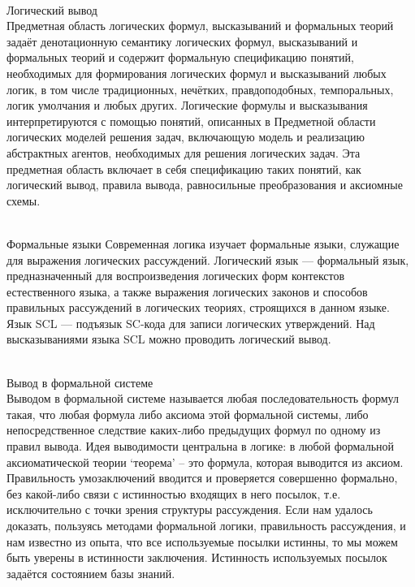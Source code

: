 \begin{frame}{\\Логический вывод}
\topline
\vspace{40pt}
 \\
 
        Предметная область логических формул, высказываний и формальных теорий задаёт денотационную семантику логических формул, высказываний и формальных теорий и содержит формальную спецификацию понятий, необходимых для формирования логических формул и высказываний любых логик, в том числе традиционных, нечётких, правдоподобных, темпоральных, логик умолчания и любых других. Логические формулы и высказывания интерпретируются с помощью понятий, описанных в Предметной области логических моделей решения задач, включающую модель и реализацию абстрактных агентов, необходимых для решения логических задач. Эта предметная область включает в себя спецификацию таких понятий, как логический вывод, правила вывода, равносильные преобразования и аксиомные схемы.
\end{frame}

\begin{frame}{\\Формальные языки}
\topline
        Современная логика изучает формальные языки, служащие для выражения логических рассуждений. Логический язык — формальный язык, предназначенный для воспроизведения логических форм контекстов естественного языка, а также выражения логических законов и способов правильных рассуждений в логических теориях, строящихся в данном языке.
        \\Язык SCL — подъязык SC-кода для записи логических утверждений. Над высказываниями языка SCL можно проводить логический вывод.
\end{frame}

\begin{frame}{\\Вывод в формальной системе}
\topline
    \vspace{10pt}
     \\
     
        Выводом в формальной системе называется любая последовательность формул такая, что любая формула либо аксиома этой формальной системы, либо непосредственное следствие каких-либо предыдущих формул по одному из правил вывода. Идея выводимости центральна в логике: в любой формальной аксиоматической теории ‘теорема’ – это формула, которая выводится из аксиом. Правильность умозаключений вводится и проверяется совершенно формально, без какой-либо связи с истинностью входящих в него посылок, т.е. исключительно с точки зрения структуры рассуждения. Если нам удалось доказать, пользуясь методами формальной логики, правильность рассуждения, и нам известно из опыта, что все используемые посылки истинны, то мы можем быть уверены в истинности заключения. Истинность используемых посылок задаётся состоянием базы знаний.
\end{frame}

